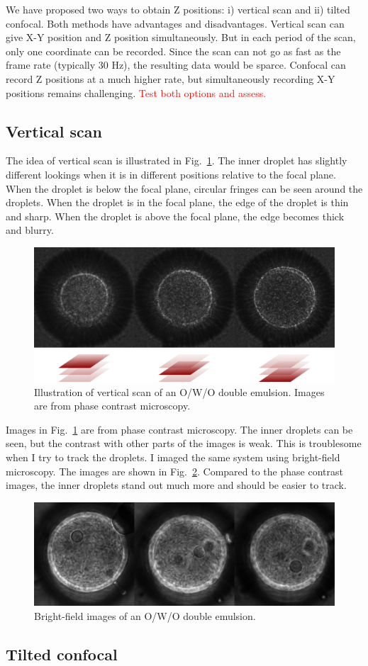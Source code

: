 \documentclass[onecolumn,aps, pre,amsmath,amssymb,longbibliography,11pt]{revtex4-2}
\begin{document}
We have proposed two ways to obtain Z positions: i) vertical scan and ii) tilted confocal.
Both methods have advantages and disadvantages.
Vertical scan can give X-Y position and Z position simultaneously.
But in each period of the scan, only one coordinate can be recorded.
Since the scan can not go as fast as the frame rate (typically 30 Hz), the resulting data would be sparce.
Confocal can record Z positions at a much higher rate, but simultaneously recording X-Y positions remains challenging.
\textcolor{red}{Test both options and assess.}

\subsection{Vertical scan}
The idea of vertical scan is illustrated in Fig.~\ref{fig:manual-scan}.
The inner droplet has slightly different lookings when it is in different positions relative to the focal plane.
When the droplet is below the focal plane, circular fringes can be seen around the droplets.
When the droplet is in the focal plane, the edge of the droplet is thin and sharp.
When the droplet is above the focal plane, the edge becomes thick and blurry.

\begin{figure}[h]
  \includegraphics{manual-scan.png}
  \caption{Illustration of vertical scan of an O/W/O double emulsion. Images are from phase contrast microscopy.}
  \label{fig:manual-scan}
\end{figure}

Images in Fig.~\ref{fig:manual-scan} are from phase contrast microscopy.
The inner droplets can be seen, but the contrast with other parts of the images is weak.
This is troublesome when I try to track the droplets.
I imaged the same system using bright-field microscopy.
The images are shown in Fig.~\ref{fig:bright-field-images}.
Compared to the phase contrast images, the inner droplets stand out much more and should be easier to track.

\begin{figure}[h]
  \includegraphics{bright-field-images.png}
  \caption{Bright-field images of an O/W/O double emulsion.}
  \label{fig:bright-field-images}
\end{figure}


\subsection{Tilted confocal}
\end{document}
